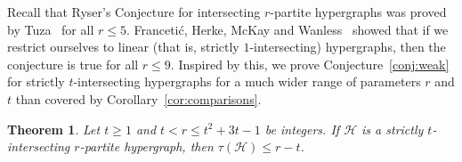 \documentclass[a4paper,twoside,11pt]{article}
\newtheorem{thm}{Theorem}
\numberwithin{thm}{section}
\theoremstyle{definition}
\theoremstyle{remark}
\theoremstyle{definition}
\newcommand{\mc}[1]{\mathcal{#1}}
\begin{document}
Recall that Ryser's Conjecture for intersecting $r$-partite hypergraphs was proved by Tuza~\cite{Tuza} for all $r \leq 5$. 
Franceti\'c, Herke, McKay and Wanless~\cite{Francetic17} showed that if we restrict ourselves to linear (that is, strictly $1$-intersecting) hypergraphs, then the conjecture is true for all $r \leq 9$. 
Inspired by this, we prove Conjecture~\ref{conj:weak} for strictly $t$-intersecting hypergraphs for a much wider range of parameters $r$ and $t$ than covered by Corollary~\ref{cor:comparisons}. 

\begin{thm} \label{thm:strictly}
Let $t \ge 1$ and $t < r \le t^2 + 3t - 1$ be integers. If $\mc H$ is a strictly $t$-intersecting $r$-partite hypergraph, then $\tau(\mc H) \leq r - t$. 
\end{thm}
\end{document}
